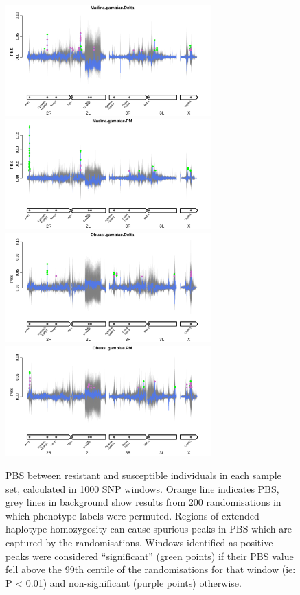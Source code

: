 \documentclass[a4paper,12pt]{article}
\begin{document}
\begin{figure}[h]
	\vskip 0.4cm
	\includegraphics*[width = 7.9cm]{../../randomisations/PBS/Madina.gambiae.Delta_peak_filter_plot.png}
	\includegraphics*[width = 7.9cm]{../../randomisations/PBS/Madina.gambiae.PM_peak_filter_plot.png}
	\vskip 0.4cm
	\includegraphics*[width = 7.9cm]{../../randomisations/PBS/Obuasi.gambiae.Delta_peak_filter_plot.png}
	\includegraphics*[width = 7.9cm]{../../randomisations/PBS/Obuasi.gambiae.PM_peak_filter_plot.png}
	\caption{\footnotesize PBS between resistant and susceptible individuals in each sample set, calculated in 1000 SNP windows. Orange line indicates PBS, grey lines in background show results from 200 randomisations in which phenotype labels were permuted. Regions of extended haplotype homozygosity can cause spurious peaks in PBS which are captured by the randomisations. Windows identified as positive peaks were considered ``significant'' (green points) if their PBS value fell above the 99th centile of the randomisations for that window (ie: P < 0.01) and non-significant (purple points) otherwise.}
	\label{FigS4}
\end{figure}
\end{document}
